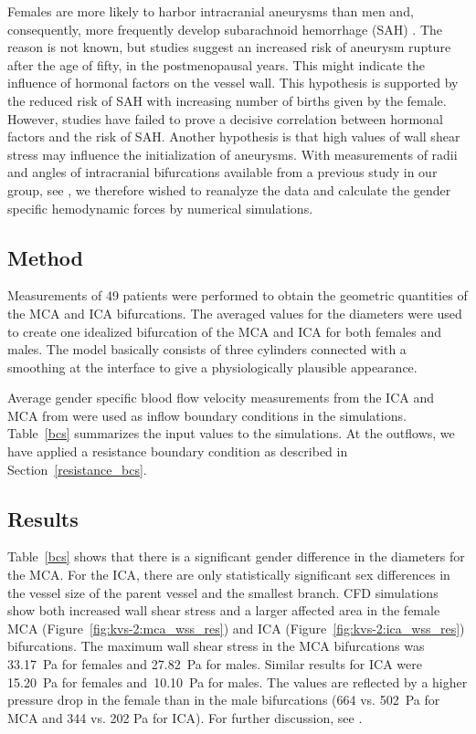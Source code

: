 Females are more likely to harbor intracranial aneurysms than men and,
consequently, more frequently develop subarachnoid hemorrhage
(SAH) \citep{EdenMeurerSanchezEtAl2008}. The reason is not known, but
studies suggest an increased risk of aneurysm rupture after the age of
fifty, in the postmenopausal years. This might indicate the influence
of hormonal factors on the vessel wall. This hypothesis is supported
by the reduced risk of SAH with increasing number of
births given by the female. However, studies
have failed to prove a decisive correlation between hormonal factors
and the risk of SAH. Another hypothesis is that high values of wall
shear stress may influence the initialization of aneurysms. With
measurements of radii and angles of intracranial bifurcations
available from a previous study in our group,
see \citet{IngebrigtsenMorganFaulderEtAl2004}, we therefore wished to
reanalyze the data and calculate the gender specific hemodynamic
forces by numerical simulations.

\subsection{Method}

Measurements of 49 patients were performed to obtain the geometric
quantities of the MCA and ICA bifurcations. The averaged values for
the diameters were used to create one idealized bifurcation of the MCA
and ICA for both females and males. The model basically consists of
three cylinders connected with a smoothing at the interface to give a
physiologically plausible appearance.

Average gender specific blood flow velocity measurements from the ICA
and MCA from \citet{KrejzaSzydlikLiebeskindEtAl2005} were used as
inflow boundary conditions in the simulations. Table~\ref{bcs}
summarizes the input values to the simulations.
At the outflows,
we have applied a resistance boundary condition as described in
Section~\ref{resistance_bcs}.

\subsection{Results}

Table~\ref{bcs} shows that there is a significant gender difference in
the diameters for the MCA. For the ICA, there are only statistically
significant sex differences in the vessel size of the parent vessel
and the smallest branch. CFD simulations show both increased wall
shear stress and a larger affected area in the female MCA
(Figure~\ref{fig:kvs-2:mca_wss_res}) and ICA
(Figure~\ref{fig:kvs-2:ica_wss_res}) bifurcations. The maximum wall
shear stress in the MCA bifurcations was 33.17~Pa for females and
27.82~Pa for males. Similar results for ICA were 15.20~Pa for females
and~10.10~Pa for males. The values are reflected by a higher pressure
drop in the female than in the male bifurcations (664 vs. 502~Pa for MCA
and 344 vs. 202 Pa for ICA). For further discussion,
see \citet{LindekleivValen-SendstadMorganEtAl2010}.

